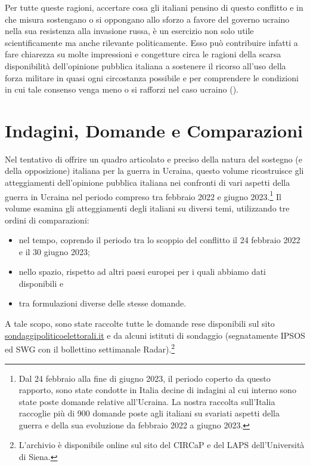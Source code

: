 \documentclass[
]{book}
\begin{document}
Per tutte queste ragioni, accertare cosa gli italiani pensino di questo conflitto e in che misura sostengano o si oppongano allo sforzo a favore del governo ucraino nella sua resistenza alla invasione russa, è un esercizio non solo utile scientificamente ma anche rilevante politicamente. Esso può contribuire infatti a fare chiarezza su molte impressioni e congetture circa le ragioni della scarsa disponibilità dell'opinione pubblica italiana a sostenere il ricorso all'uso della forza militare in quasi ogni circostanza possibile e per comprendere le condizioni in cui tale consenso venga meno o si rafforzi nel caso ucraino (\citet{Everts-e-Isernia2015}).

\hypertarget{indagini-domande-e-comparazioni}{%
\section{Indagini, Domande e Comparazioni}\label{indagini-domande-e-comparazioni}}

Nel tentativo di offrire un quadro articolato e preciso della natura del sostegno (e della opposizione) italiana per la guerra in Ucraina, questo volume ricostruisce gli atteggiamenti dell'opinione pubblica italiana nei confronti di vari aspetti della guerra in Ucraina nel periodo compreso tra febbraio 2022 e giugno 2023.\footnote{Dal 24 febbraio alla fine di giugno 2023, il periodo coperto da questo rapporto, sono state condotte in Italia decine di indagini al cui interno sono state poste domande relative all'Ucraina. La nostra raccolta sull'Italia raccoglie più di 900 domande poste agli italiani su svariati aspetti della guerra e della sua evoluzione da febbraio 2022 a giugno 2023.} Il volume esamina gli atteggiamenti degli italiani su diversi temi, utilizzando tre ordini di comparazioni:

\begin{itemize}
\item
  nel tempo, coprendo il periodo tra lo scoppio del conflitto il 24 febbraio 2022 e il 30 giugno 2023;
\item
  nello spazio, rispetto ad altri paesi europei per i quali abbiamo dati disponibili e
\item
  tra formulazioni diverse delle stesse domande.
\end{itemize}

A tale scopo, sono state raccolte tutte le domande rese disponibili sul sito \href{http://www.sondaggipoliticoelettorali.it/}{sondaggipoliticoelettorali.it} e da alcuni istituti di sondaggio (segnatamente IPSOS ed SWG con il bollettino settimanale Radar).\footnote{L'archivio è disponibile online sul sito del CIRCaP e del LAPS dell'Università di Siena.}
\end{document}
